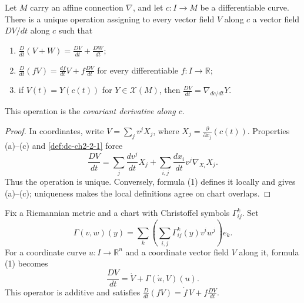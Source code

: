 \begin{proposition}
  \label{prop:dc-ch2-2-2}
  \leanok
  Let $M$ carry an affine connection $\nabla$, and let $c\colon I\to M$ be a
  differentiable curve. There is a unique operation assigning to every vector
  field $V$ along $c$ a vector field $DV/dt$ along $c$ such that
  \begin{enumerate}
    \item[(a)] $\frac{D}{dt}(V+W)=\frac{DV}{dt}+\frac{DW}{dt}$;
    \item[(b)] $\frac{D}{dt}(fV)=\frac{df}{dt}V+f\frac{DV}{dt}$ for every
      differentiable $f\colon I\to\mathbb{R}$;
    \item[(c)] if $V(t)=Y(c(t))$ for $Y\in\mathcal{X}(M)$, then
      $\frac{DV}{dt}=\nabla_{dc/dt}Y$.
  \end{enumerate}
  This operation is the \emph{covariant derivative along $c$}.
\end{proposition}
\begin{proof}
  \leanok
  \sketch
  In coordinates, write $V=\sum_jv^jX_j$, where
  $X_j=\frac{\partial}{\partial x_j}(c(t))$. Properties (a)--(c) and
  \cref{def:dc-ch2-2-1} force
  \[
    \frac{DV}{dt}
    =\sum_j\frac{dv^j}{dt}X_j
      +\sum_{i,j}\frac{dx_i}{dt}v^j\nabla_{X_i}X_j.\tag{1}
  \]
  Thus the operation is unique. Conversely, formula (1) defines it locally and
  gives (a)--(c); uniqueness makes the local definitions agree on chart
  overlaps.
\end{proof}

\begin{lemma}
  \label{lem:dc-ch2-2-2-coord}
  \leanok
  Fix a Riemannian metric and a chart with Christoffel symbols $\Gamma^k_{ij}$.
  Set
  \[
    \Gamma(v,w)(y)=\sum_k\left(\sum_{i,j}\Gamma^k_{ij}(y)v^iw^j\right)e_k.
  \]
  For a coordinate curve $u\colon I\to\mathbb{R}^n$ and a coordinate vector
  field $V$ along it, formula (1) becomes
  \[
    \frac{DV}{dt}=\dot V+\Gamma(\dot u,V)(u).
  \]
  This operator is additive and satisfies
  $\frac{D}{dt}(fV)=\dot f\,V+f\frac{DV}{dt}$.
\end{lemma}

